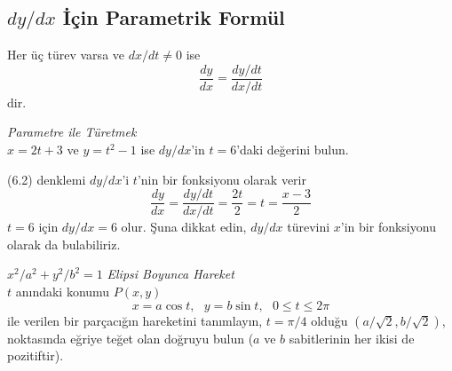 \subsection{\protect $dy/dx$ İçin Parametrik Formül}
Her üç türev varsa ve $dx/dt \ne 0$ ise
	\begin{equation}
	\frac{dy}{dx}=\frac{dy/dt}{dx/dt}
\end{equation}
dir.
\begin{ornek}\textit{Parametre ile Türetmek}\\
$x=2t +3$ ve $y=t^2-1$ ise $dy/dx$'in $t=6$'daki değerini bulun.
\end{ornek}
\begin{cozum}
(6.2) denklemi $dy/dx$'i $t$'nin bir fonksiyonu olarak verir
	\begin{equation*}
	\frac{dy}{dx}= \frac{dy/dt}{dx/dt}=\frac{2t}{2}=t=\frac{x-3}{2}
	\end{equation*}
$t=6$ için $dy/dx =6 $ olur. Şuna dikkat edin, $dy/dx$ türevini $x$'in bir fonksiyonu olarak da bulabiliriz.
\end{cozum}
\begin{ornek} $x^2/a^2 +y^2/b^2 =1$ \textit{Elipsi Boyunca Hareket}\\
$t$ anındaki konumu $P(x,y)$ 
	\begin{equation*}
	x=a \cos t ,\textit{ 	} y= b \sin t , \textit{ 		} 0 \leq t \leq 2\pi
	\end{equation*}
ile verilen bir parçacığın hareketini tanımlayın, $t =\pi/ 4$ olduğu $(a/\sqrt{2},b/\sqrt{2})$, noktasında eğriye teğet olan doğruyu bulun ($a$ ve $b$ sabitlerinin her ikisi de pozitiftir).
\end{ornek}
